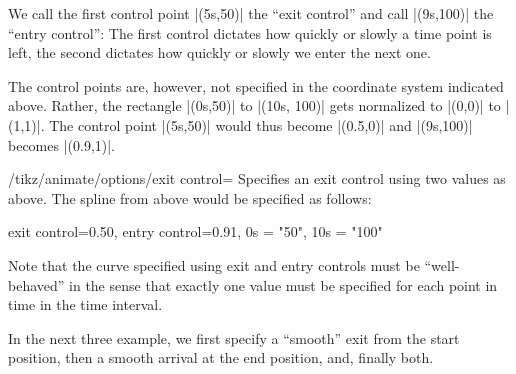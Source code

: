 We call the first control point |(5s,50)| the ``exit control'' and
call |(9s,100)| the ``entry control'': The first control dictates
how quickly or slowly a time point is left, the second dictates how
quickly or slowly we enter the next one.

The control points are, however, not specified in the coordinate
system indicated above. Rather, the rectangle |(0s,50)| to
|(10s, 100)| gets normalized to |(0,0)| to |(1,1)|. The control
point |(5s,50)| would thus become |(0.5,0)| and |(9s,100)| becomes
|(0.9,1)|. 
  
\begin{key}{/tikz/animate/options/exit control=}
  Specifies an exit control using two values as above. The spline
  from above would be specified as follows:

\begin{codeexample}
exit control={0.5}{0},
entry control={0.9}{1},
0s = "50",
10s = "100"
\end{codeexample}

  Note that the curve specified using exit and entry controls must
  be ``well-behaved'' in the sense that exactly one value must be
  specified for each point in time in the time interval.

  In the next three example, we first specify a ``smooth'' exit from
  the start position, then a smooth arrival at the end position,
  and, finally both.
    
\begin{codeexample}[animation list={0.333/\frac{1}{3},0.666/\frac{2}{3},1,1.333/1\frac{1}{3},1.666/1\frac{2}{3}}]
\end{codeexample}

\begin{codeexample}[animation list={0.333/\frac{1}{3},0.666/\frac{2}{3},1,1.333/1\frac{1}{3},1.666/1\frac{2}{3}}]
\end{codeexample}

\begin{codeexample}[animation list={0.333/\frac{1}{3},0.666/\frac{2}{3},1,1.333/1\frac{1}{3},1.666/1\frac{2}{3}}]
\end{codeexample}
\end{key}

